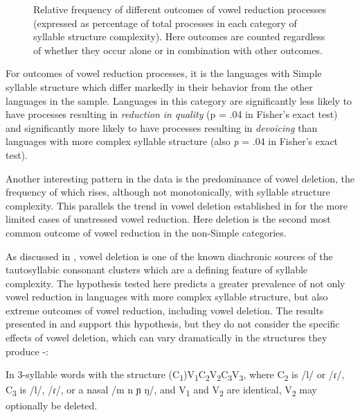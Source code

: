   
\begin{figure}
\caption{\label{fig:6.4} Relative frequency of different outcomes of vowel reduction processes (expressed as percentage of total processes in each category of syllable structure complexity). Here outcomes are counted regardless of whether they occur alone or in combination with other outcomes.}
\end{figure}

  For outcomes of vowel reduction processes, it is the languages with Simple syllable structure which differ markedly in their behavior from the other languages in the sample. Languages in this category are significantly less likely to have processes resulting in \textit{reduction in quality} (p = .04 in Fisher’s exact test) and significantly more likely to have processes resulting in \textit{devoicing} than languages with more complex syllable structure (also \textit{p} = .04 in Fisher’s exact test).

  Another interesting pattern in the data is the predominance of vowel deletion, the frequency of which rises, although not monotonically, with syllable structure complexity. This parallels the trend in vowel deletion established in  for the more limited cases of unstressed vowel reduction. Here deletion is the second most common outcome of vowel reduction in the non-Simple categories. 

  As discussed in , vowel deletion is one of the known diachronic sources of the tautosyllabic consonant clusters which are a defining feature of syllable complexity. The hypothesis tested here predicts a greater prevalence of not only vowel reduction in languages with more complex syllable structure, but also extreme outcomes of vowel reduction, including vowel deletion. The results presented in  and  support this hypothesis, but they do not consider the specific effects of vowel deletion, which can vary dramatically in the structures they produce -:

\ea\label{ex:6.14}

  In 3-syllable words with the structure (C\textsubscript{1})V\textsubscript{1}C\textsubscript{2}V\textsubscript{2}C\textsubscript{3}V\textsubscript{3}, where C\textsubscript{2} is /l/ or /ɾ/, C\textsubscript{3} is /l/, /ɾ/, or a nasal /m n ɲ ŋ/, and V\textsubscript{1} and V\textsubscript{2} are identical, V\textsubscript{2} may optionally be deleted.

